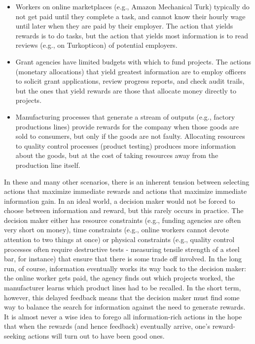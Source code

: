 \documentclass[authoryear]{elsarticle}
\begin{document}
\begin{itemize}
\item Workers on online marketplaces (e.g., Amazon Mechanical Turk) typically do not get paid until they complete a task, and cannot know their hourly wage until later when they are paid by their employer. The action that yields rewards is to do tasks, but the action that yields most information is to read reviews (e.g., on Turkopticon) of potential employers.
\item Grant agencies have limited budgets with which to fund projects. The actions (monetary allocations) that yield greatest information are to employ officers to solicit grant applications, review progress reports, and check audit trails, but the ones that yield rewards are those that allocate money directly to projects.
\item Manufacturing processes that generate a stream of outputs (e.g., factory productions lines) provide rewards for the company when those goods are sold to consumers, but only if the goods are not faulty. Allocating resources to quality control processes (product testing) produces more information about the goods, but at the cost of taking resources away from the production line itself.
\end{itemize}

\noindent
In these and many other scenarios, there is an inherent tension between selecting actions that maximize immediate rewards and actions that maximize immediate information gain. In an ideal world, a decision maker would not be forced to choose between information and reward, but this rarely occurs in practice. The decision maker either has resource constraints (e.g., funding agencies are often very short on money), time constraints (e.g., online workers cannot devote attention to two things at once) or physical constraints (e.g., quality control processes often require destructive tests - measuring tensile strength of a steel bar, for instance) that ensure that there is some trade off involved. In the long run, of course, information eventually works its way back to the decision maker: the online worker gets paid, the agency finds out which projects worked, the manufacturer learns which product lines had to be recalled. In the short term, however, this delayed feedback means that the decision maker must find some way to balance the search for information against the need to generate rewards. It is almost never a wise idea to forego all information-rich actions in the hope that when the rewards (and hence feedback) eventually arrive, one's reward-seeking actions will turn out to have been good ones.
\end{document}
